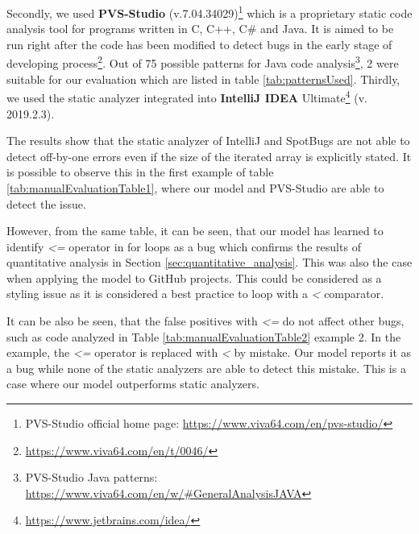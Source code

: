 Secondly, we used \textbf{PVS-Studio} (v.7.04.34029)\footnote{PVS-Studio official home page: \url{https://www.viva64.com/en/pvs-studio/}} which is a proprietary static code analysis tool for programs written in C, C++, C\# and Java. It is aimed to be run right after the code has been modified to detect bugs in the early stage of developing process\footnote{\url{https://www.viva64.com/en/t/0046/}}. Out of 75 possible patterns for Java code analysis\footnote{PVS-Studio Java patterns: \url{https://www.viva64.com/en/w/#GeneralAnalysisJAVA}}, 2 were suitable for our evaluation which are listed in table \ref{tab:patternsUsed}. Thirdly, we used the static analyzer integrated into \textbf{IntelliJ IDEA} Ultimate\footnote{\url{https://www.jetbrains.com/idea/}} (v. 2019.2.3).

The results show that the static analyzer of IntelliJ and SpotBugs are not able to detect off-by-one errors even if the size of the iterated array is explicitly stated. It is possible to observe this in the first example of table \ref{tab:manualEvaluationTable1},  where our model and PVS-Studio are able to detect the issue.

However, from the same table, it can be seen, that our model has learned to identify \textit{<=} operator in for loops as a bug which confirms the results of quantitative analysis in Section \ref{sec:quantitative_analysis}. This was also the case when applying the model to GitHub projects. This could be considered as a styling issue as it is considered a best practice to loop with a \textit{<} comparator.

It can be also be seen, that the false positives with \textit{<=} do not affect other bugs, such as code analyzed in Table  \ref{tab:manualEvaluationTable2} example 2. In the example, the \textit{<=} operator is replaced with \textit{<} by mistake. Our model reports it as a bug while none of the static analyzers are able to detect this mistake. This is a case where our model outperforms static analyzers. 
